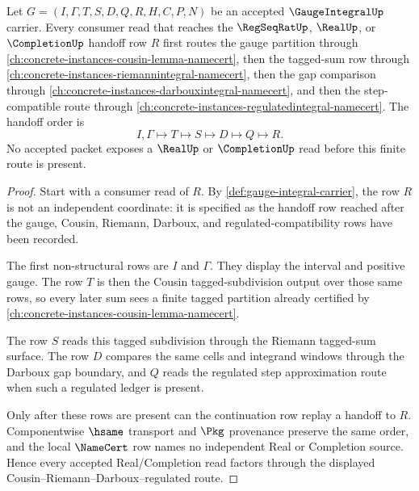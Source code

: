 \begin{theorem}
\label{thm:gauge-integral-cousin-riemann-handoff}
Let $G=(I,\Gamma,T,S,D,Q,R,H,C,P,N)$ be an accepted $\GaugeIntegralUp$ carrier. Every consumer read that reaches the $\RegSeqRatUp$, $\RealUp$, or $\CompletionUp$ handoff row $R$ first routes the gauge partition through \autoref{ch:concrete-instances-cousin-lemma-namecert}, then the tagged-sum row through \autoref{ch:concrete-instances-riemannintegral-namecert}, then the gap comparison through \autoref{ch:concrete-instances-darbouxintegral-namecert}, and then the step-compatible route through \autoref{ch:concrete-instances-regulatedintegral-namecert}. The handoff order is
$$
I,\Gamma \longmapsto T \longmapsto S \longmapsto D \longmapsto Q \longmapsto R .
$$
No accepted packet exposes a $\RealUp$ or $\CompletionUp$ read before this finite route is present.
\end{theorem}
\begin{proof}
Start with a consumer read of $R$. By \autoref{def:gauge-integral-carrier}, the row $R$ is not an independent coordinate: it is specified as the handoff row reached after the gauge, Cousin, Riemann, Darboux, and regulated-compatibility rows have been recorded.

The first non-structural rows are $I$ and $\Gamma$. They display the interval and positive gauge. The row $T$ is then the Cousin tagged-subdivision output over those same rows, so every later sum sees a finite tagged partition already certified by \autoref{ch:concrete-instances-cousin-lemma-namecert}.

The row $S$ reads this tagged subdivision through the Riemann tagged-sum surface. The row $D$ compares the same cells and integrand windows through the Darboux gap boundary, and $Q$ reads the regulated step approximation route when such a regulated ledger is present.

Only after these rows are present can the continuation row replay a handoff to $R$. Componentwise $\hsame$ transport and $\Pkg$ provenance preserve the same order, and the local $\NameCert$ row names no independent Real or Completion source. Hence every accepted Real/Completion read factors through the displayed Cousin--Riemann--Darboux--regulated route.
\end{proof}


